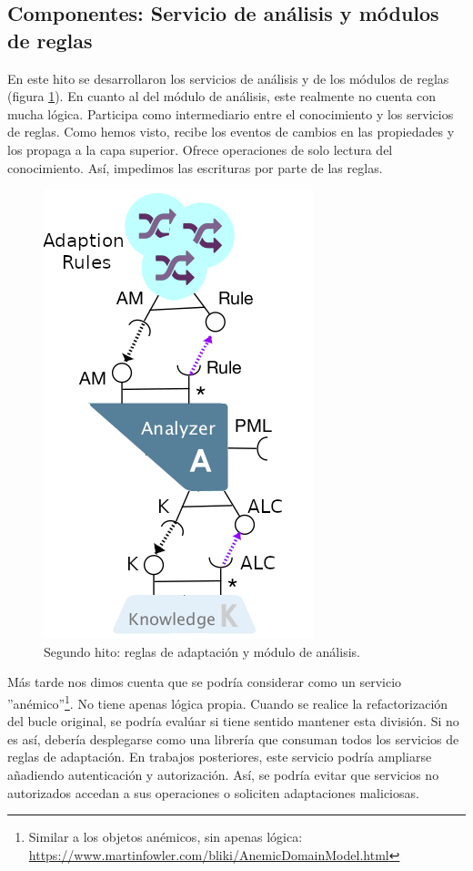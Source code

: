 \subsection{Componentes: Servicio de análisis y módulos de reglas}

En este hito se desarrollaron los servicios de análisis y de los módulos de reglas (figura \ref{fig:hito-2-analisis}). En cuanto al del módulo de análisis, este realmente no cuenta con mucha lógica. Participa como intermediario entre el conocimiento y los servicios de reglas. Como hemos visto, recibe los eventos de cambios en las propiedades y los propaga a la capa superior. Ofrece operaciones de solo lectura del conocimiento. Así, impedimos las escrituras por parte de las reglas.

\begin{figure}
  \vspace{-20pt}
  \centering
  \includegraphics[scale=0.6]{cap_implementacion/images/hito-2-analisis}
\caption{Segundo hito: reglas de adaptación y módulo de análisis.}
  \label{fig:hito-2-analisis}
  \vspace{-10pt}
\end{figure}

Más tarde nos dimos cuenta que se podría considerar como un servicio ''anémico''\footnote{Similar a los objetos anémicos, sin apenas lógica: \url{https://www.martinfowler.com/bliki/AnemicDomainModel.html}}. No tiene apenas lógica propia. Cuando se realice la refactorización del bucle original, se podría evalúar si tiene sentido mantener esta división. Si no es así, debería desplegarse como una librería que consuman todos los servicios de reglas de adaptación. En trabajos posteriores, este servicio podría ampliarse añadiendo autenticación y autorización. Así, se podría evitar que servicios no autorizados accedan a sus operaciones o soliciten adaptaciones maliciosas.

